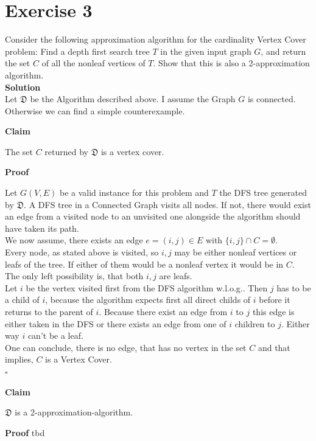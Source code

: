 \documentclass[11pt,a4paper,ngerman]{article}
\newcommand{\claim}{\addtocounter{claims}{1} \bfseries Claim \arabic{claims}}
\newcommand{\proof}{\bfseries Proof}
\begin{document}
\section*{Exercise 3}
Consider the following approximation algorithm for the cardinality Vertex Cover problem: Find a depth first search tree $T$ in the given input graph $G$, and return the set $C$ of all the nonleaf vertices of $T$. Show that this is also a 2-approximation algorithm.\\

\textbf{Solution}\\
Let $\mathfrak{D}$ be the Algorithm described above. I assume the Graph $G$ is connected. Otherwise we can find a simple counterexample.

\begin{description}
	\item{\claim} The set $C$ returned by $\mathfrak{D}$ is a vertex cover.
	\item{\proof}

Let $G(V,E)$ be a valid instance for this problem and $T$ the DFS tree generated by $\mathfrak{D}$. A DFS tree in a Connected Graph visits all nodes. If not, there would exist an edge from a visited node to an unvisited one alongside the algorithm should have taken its path.\\

We now assume, there exists an edge $e=(i,j)\in E$ with $\{i , j\} \cap C = \emptyset$.\\
Every node, as stated above is visited, so $i,j$ may be either nonleaf vertices or leafs of the tree. If either of them would be a nonleaf vertex it would be in $C$. The only left possibility is, that both $i,j$ are leafs.\\
Let $i$ be the vertex visited first from the DFS algorithm w.l.o.g.. Then $j$ has to be a child of $i$, because the algorithm expects first all direct childs of $i$ before it returns to the parent of $i$. Because there exist an edge from $i$ to $j$ this edge is either taken in the DFS or there exists an edge from one of $i$ children to $j$. Either way $i$ can't be a leaf.\\

One can conclude, there is no edge, that has no vertex in the set $C$ and that implies, $C$ is a Vertex Cover.\\
\mbox{} \hfill $\square$  

	\item{\claim} $\mathfrak{D}$ is a 2-approximation-algorithm.
	\item{\proof}
tbd
\end{description}

\label{LastPage}
\end{document}
